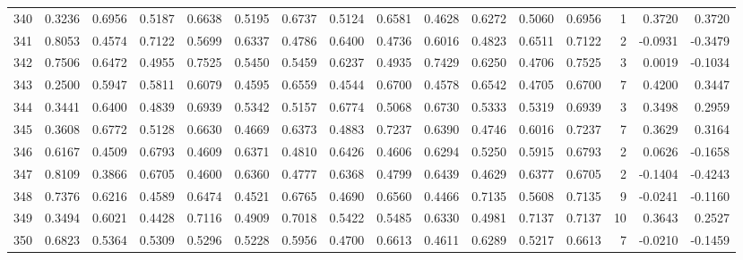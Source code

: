 \begin{tabular}{lrrrrrrrrrrrrrrr}
340 &      0.3236 &  0.6956 &  0.5187 &  0.6638 &  0.5195 &  0.6737 &  0.5124 &  0.6581 &  0.4628 &  0.6272 &   0.5060 &     0.6956 &      1 &                    0.3720 &                     0.3720 \\
341 &      0.8053 &  0.4574 &  0.7122 &  0.5699 &  0.6337 &  0.4786 &  0.6400 &  0.4736 &  0.6016 &  0.4823 &   0.6511 &     0.7122 &      2 &                   -0.0931 &                    -0.3479 \\
342 &      0.7506 &  0.6472 &  0.4955 &  0.7525 &  0.5450 &  0.5459 &  0.6237 &  0.4935 &  0.7429 &  0.6250 &   0.4706 &     0.7525 &      3 &                    0.0019 &                    -0.1034 \\
343 &      0.2500 &  0.5947 &  0.5811 &  0.6079 &  0.4595 &  0.6559 &  0.4544 &  0.6700 &  0.4578 &  0.6542 &   0.4705 &     0.6700 &      7 &                    0.4200 &                     0.3447 \\
344 &      0.3441 &  0.6400 &  0.4839 &  0.6939 &  0.5342 &  0.5157 &  0.6774 &  0.5068 &  0.6730 &  0.5333 &   0.5319 &     0.6939 &      3 &                    0.3498 &                     0.2959 \\
345 &      0.3608 &  0.6772 &  0.5128 &  0.6630 &  0.4669 &  0.6373 &  0.4883 &  0.7237 &  0.6390 &  0.4746 &   0.6016 &     0.7237 &      7 &                    0.3629 &                     0.3164 \\
346 &      0.6167 &  0.4509 &  0.6793 &  0.4609 &  0.6371 &  0.4810 &  0.6426 &  0.4606 &  0.6294 &  0.5250 &   0.5915 &     0.6793 &      2 &                    0.0626 &                    -0.1658 \\
347 &      0.8109 &  0.3866 &  0.6705 &  0.4600 &  0.6360 &  0.4777 &  0.6368 &  0.4799 &  0.6439 &  0.4629 &   0.6377 &     0.6705 &      2 &                   -0.1404 &                    -0.4243 \\
348 &      0.7376 &  0.6216 &  0.4589 &  0.6474 &  0.4521 &  0.6765 &  0.4690 &  0.6560 &  0.4466 &  0.7135 &   0.5608 &     0.7135 &      9 &                   -0.0241 &                    -0.1160 \\
349 &      0.3494 &  0.6021 &  0.4428 &  0.7116 &  0.4909 &  0.7018 &  0.5422 &  0.5485 &  0.6330 &  0.4981 &   0.7137 &     0.7137 &     10 &                    0.3643 &                     0.2527 \\
350 &      0.6823 &  0.5364 &  0.5309 &  0.5296 &  0.5228 &  0.5956 &  0.4700 &  0.6613 &  0.4611 &  0.6289 &   0.5217 &     0.6613 &      7 &                   -0.0210 &                    -0.1459 \\

\end{tabular}
